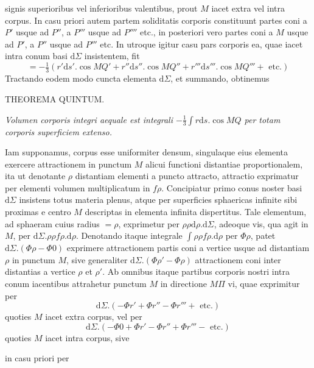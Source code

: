 signis superioribus vel inferioribus valentibus, prout $M$ iacet extra vel intra corpus. In casu priori autem partem soliditatis corporis constituunt partes coni a $P'$ usque ad $P''$, a $P'''$ usque ad $P''''$ etc., in posteriori vero partes coni a $M$ usque ad $P'$, a $P''$ usque ad $P'''$ etc. In utroque igitur casu pars corporis ea, quae iacet intra conum basi $\mathrm{d}\Sigma$ insistentem, fit
\[
=-\tfrac13(r'\mathrm{d}s'.\cos MQ'+r''\mathrm{d}s''.\cos MQ''+r'''\mathrm{d}s'''.\cos MQ'''+\text{ etc.})
\]
Tractando eodem modo cuncta elementa $\mathrm{d}\Sigma$, et summando, obtinemus
\par\medskip{}
\begin{center}THEOREMA QUINTUM.\end{center}
\par
\textit{Volumen corporis integri aequale est integrali $-\tfrac13\int r\mathrm{d}s.\cos MQ$ per totam corporis superficiem extenso.}

\par
Iam supponamus, corpus esse uniformiter densum, singulaque eius elementa exercere attractionem in punctum $M$ alicui functioni distantiae proportionalem, ita ut denotante $\rho$ distantiam elementi a puncto attracto, attractio exprimatur per elementi volumen multiplicatum in $f\rho$. Concipiatur primo conus noster basi $\mathrm{d}\Sigma$ insistens totus materia plenus, atque per superficies sphaericas infinite sibi proximas e centro $M$ descriptas in elementa infinita dispertitus. Tale elementum, ad sphaeram cuius radius $=\rho$, exprimetur per $\rho\rho\mathrm{d}\rho.\mathrm{d}\Sigma$, adeoque vis, qua agit in $M$, per $\mathrm{d}\Sigma.\rho\rho f\rho.\mathrm{d}\rho$. Denotando itaque integrale $\int\rho\rho f\rho.\mathrm{d}\rho$ per $\Phi\rho$, patet $\mathrm{d}\Sigma.(\Phi\rho-\Phi0)$ exprimere attractionem partis coni a vertice usque ad distantiam $\rho$ in punctum $M$, sive generaliter $\mathrm{d}\Sigma.(\Phi\rho'-\Phi\rho)$ attractionem coni inter distantias a vertice $\rho$ et $\rho'$. Ab omnibus itaque partibus corporis nostri intra conum iacentibus attrahetur punctum $M$ in directione $M\Pi$ vi, quae exprimitur per
\[
\mathrm{d}\Sigma.(-\Phi r'+\Phi r''-\Phi r'''+\text{ etc.})
\]
quoties $M$ iacet extra corpus, vel per
\[
\mathrm{d}\Sigma.(-\Phi0+\Phi r'-\Phi r''+\Phi r'''-\text{ etc.})
\]
quoties $M$ iacet intra corpus, sive
\par
in casu priori per
